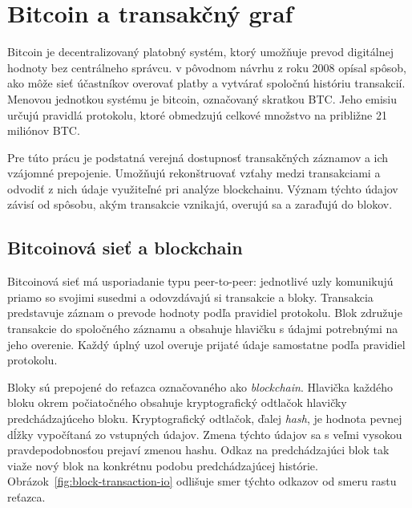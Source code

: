 \section{Bitcoin a transakčný graf}
\label{sec:bitcoin}

Bitcoin je decentralizovaný platobný systém, ktorý umožňuje prevod
digitálnej hodnoty bez centrálneho správcu. \textcite{nakamoto2008bitcoin}
v pôvodnom návrhu z roku 2008 opísal spôsob, ako môže sieť účastníkov
overovať platby a vytvárať spoločnú históriu transakcií. Menovou
jednotkou systému je bitcoin, označovaný skratkou BTC. Jeho emisiu
určujú pravidlá protokolu, ktoré obmedzujú celkové množstvo na približne
21 miliónov BTC.

Pre túto prácu je podstatná verejná dostupnosť transakčných záznamov
a ich vzájomné prepojenie. Umožňujú rekonštruovať vzťahy medzi
transakciami a odvodiť z nich údaje využiteľné pri analýze blockchainu.
Význam týchto údajov závisí od spôsobu, akým transakcie vznikajú,
overujú sa a zaraďujú do blokov.


\subsection{Bitcoinová sieť a blockchain}

Bitcoinová sieť má usporiadanie typu peer-to-peer: jednotlivé uzly
komunikujú priamo so svojimi susedmi a odovzdávajú si transakcie
a bloky. Transakcia predstavuje záznam o prevode hodnoty podľa
pravidiel protokolu. Blok združuje transakcie do spoločného záznamu
a obsahuje hlavičku s údajmi potrebnými na jeho overenie. Každý
úplný uzol overuje prijaté údaje samostatne podľa pravidiel protokolu.

Bloky sú prepojené do reťazca označovaného ako \emph{blockchain}.
Hlavička každého bloku okrem počiatočného obsahuje kryptografický
odtlačok hlavičky predchádzajúceho bloku. Kryptografický odtlačok,
ďalej \emph{hash}, je hodnota pevnej dĺžky vypočítaná zo vstupných
údajov. Zmena týchto údajov sa s veľmi vysokou pravdepodobnosťou
prejaví zmenou hashu. Odkaz na predchádzajúci blok tak viaže nový
blok na konkrétnu podobu predchádzajúcej histórie.
Obrázok~\ref{fig:block-transaction-io} odlišuje smer týchto odkazov
od smeru rastu reťazca.

